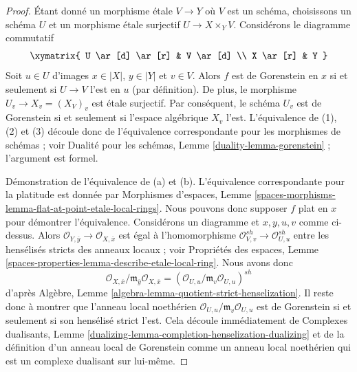 \begin{proof}
Étant donné un morphisme étale $V \to Y$ où $V$ est un schéma,
choisissons un schéma $U$ et un morphisme étale surjectif $U \to X \times_Y V$.
Considérons le diagramme commutatif
$$
\xymatrix{
U \ar[d] \ar[r] & V \ar[d] \\
X \ar[r] & Y
}
$$
Soit $u \in U$ d'images $x \in |X|$, $y \in |Y|$ et $v \in V$.
Alors $f$ est de Gorenstein en $x$ si et seulement si $U \to V$ l'est
en $u$ (par définition). De plus, le morphisme
$U_v \to X_v = (X_V)_v$ est étale surjectif. Par conséquent, le schéma $U_v$ est
de Gorenstein si et seulement si l'espace algébrique $X_v$ l'est.
L'équivalence de (1), (2) et (3) découle donc de
l'équivalence correspondante pour les morphismes de
schémas ; voir Dualité pour les schémas, Lemme \ref{duality-lemma-gorenstein} ;
l'argument est formel.

\medskip\noindent
Démonstration de l'équivalence de (a) et (b). L'équivalence correspondante
pour la platitude est donnée par Morphismes d'espaces, Lemme
\ref{spaces-morphisms-lemma-flat-at-point-etale-local-rings}.
Nous pouvons donc supposer $f$ plat en $x$ pour démontrer l'équivalence.
Considérons un diagramme et $x, y, u, v$ comme ci-dessus. Alors
$\mathcal{O}_{Y, \overline{y}} \to \mathcal{O}_{X, \overline{x}}$
est égal à l'homomorphisme
$\mathcal{O}_{V, v}^{sh} \to \mathcal{O}_{U, u}^{sh}$
entre les hensélisés stricts des anneaux locaux ; voir
Propriétés des espaces, Lemme
\ref{spaces-properties-lemma-describe-etale-local-ring}.
Nous avons donc
$$
\mathcal{O}_{X, \overline{x}}/
\mathfrak m_{\overline{y}}\mathcal{O}_{X, \overline{x}} =
(\mathcal{O}_{U, u}/\mathfrak m_v \mathcal{O}_{U, u})^{sh}
$$
d'après Algèbre, Lemme \ref{algebra-lemma-quotient-strict-henselization}.
Il reste donc à montrer que l'anneau local noethérien
$\mathcal{O}_{U, u}/\mathfrak m_v \mathcal{O}_{U, u}$
est de Gorenstein si et seulement si son hensélisé strict l'est.
Cela découle immédiatement de
Complexes dualisants, Lemme
\ref{dualizing-lemma-completion-henselization-dualizing}
et de la définition d'un anneau local de Gorenstein comme un
anneau local noethérien qui est un complexe dualisant sur lui-même.
\end{proof}

